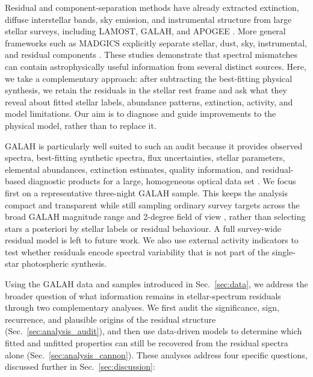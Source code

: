 \documentclass[twocolumn,apj,numberedappendix,appendixfloats]{openjournal}
\begin{document}
Residual and component-separation methods have already extracted extinction, diffuse interstellar bands, sky emission, and instrumental structure from large stellar surveys, including LAMOST, GALAH, and APOGEE \citep{Ho2017,Buder2018,Vogrincic2023, McKinnon2024}. More general frameworks such as \textsc{MADGICS} explicitly separate stellar, dust, sky, instrumental, and residual components \citep{Saydjari2023}. These studies demonstrate that spectral mismatches can contain astrophysically useful information from several distinct sources. Here, we take a complementary approach: after subtracting the best-fitting physical synthesis, we retain the residuals in the stellar rest frame and ask what they reveal about fitted stellar labels, abundance patterns, extinction, activity, and model limitations. Our aim is to diagnose and guide improvements to the physical model, rather than to replace it.

GALAH is particularly well suited to such an audit because it provides observed spectra, best-fitting synthetic spectra, flux uncertainties, stellar parameters, elemental abundances, extinction estimates, quality information, and residual-based diagnostic products for a large, homogeneous optical data set \citep{DeSilva2015, Buder2025b}. We focus first on a representative three-night GALAH sample. This keeps the analysis compact and transparent while still sampling ordinary survey targets across the broad GALAH magnitude range and 2-degree field of view \citep{Martell2017}, rather than selecting stars a posteriori by stellar labels or residual behaviour. A full survey-wide residual model is left to future work. We also use external activity indicators to test whether residuals encode spectral variability that is not part of the single-star photospheric synthesis.

Using the GALAH data and samples introduced in Sec.~\ref{sec:data}, we address the broader question of what information remains in stellar-spectrum residuals through two complementary analyses. We first audit the significance, sign, recurrence, and plausible origins of the residual structure (Sec.~\ref{sec:analysis_audit}), and then use data-driven models to determine which fitted and unfitted properties can still be recovered from the residual spectra alone (Sec.~\ref{sec:analysis_cannon}). These analyses address four specific questions, discussed further in Sec.~\ref{sec:discussion}:
\end{document}
